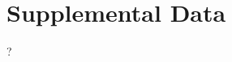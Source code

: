 \documentclass[utf8]{frontiersSCNS} %
\begin{document}
\section*{Supplemental Data}
?





\end{document}

